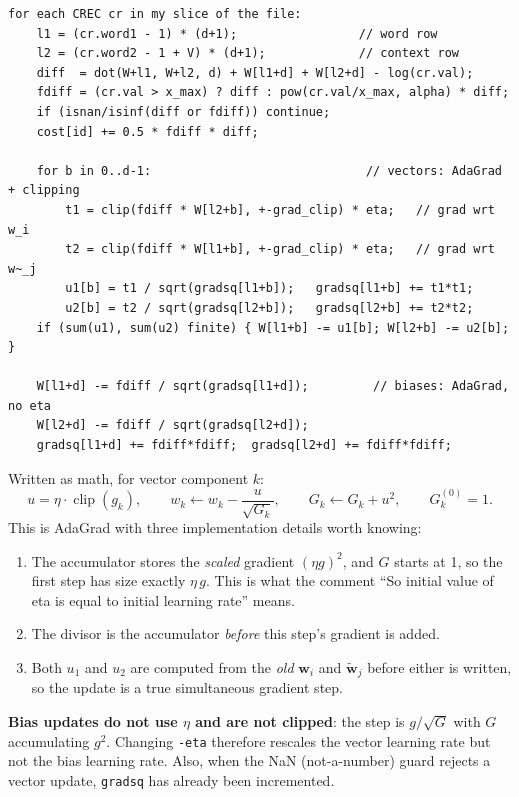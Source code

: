 \documentclass[11pt,a4paper]{article}
\newcommand{\fn}[1]{\texttt{#1()}}
\newcommand{\opt}[1]{\texttt{-#1}}
\newcommand{\wv}{\mathbf{w}}
\newcommand{\cv}{\tilde{\mathbf{w}}}
\begin{document}
\begin{lstlisting}[caption={Core of \fn{glove\_thread}, lightly condensed.},label=lst:inner]
for each CREC cr in my slice of the file:
    l1 = (cr.word1 - 1) * (d+1);                 // word row
    l2 = (cr.word2 - 1 + V) * (d+1);             // context row
    diff  = dot(W+l1, W+l2, d) + W[l1+d] + W[l2+d] - log(cr.val);
    fdiff = (cr.val > x_max) ? diff : pow(cr.val/x_max, alpha) * diff;
    if (isnan/isinf(diff or fdiff)) continue;
    cost[id] += 0.5 * fdiff * diff;

    for b in 0..d-1:                              // vectors: AdaGrad + clipping
        t1 = clip(fdiff * W[l2+b], +-grad_clip) * eta;   // grad wrt w_i
        t2 = clip(fdiff * W[l1+b], +-grad_clip) * eta;   // grad wrt w~_j
        u1[b] = t1 / sqrt(gradsq[l1+b]);   gradsq[l1+b] += t1*t1;
        u2[b] = t2 / sqrt(gradsq[l2+b]);   gradsq[l2+b] += t2*t2;
    if (sum(u1), sum(u2) finite) { W[l1+b] -= u1[b]; W[l2+b] -= u2[b]; }

    W[l1+d] -= fdiff / sqrt(gradsq[l1+d]);         // biases: AdaGrad, no eta
    W[l2+d] -= fdiff / sqrt(gradsq[l2+d]);
    gradsq[l1+d] += fdiff*fdiff;  gradsq[l2+d] += fdiff*fdiff;
\end{lstlisting}

Written as math, for vector component $k$:
\[
  u = \eta\cdot\operatorname{clip}(g_k),\qquad
  w_k \leftarrow w_k - \frac{u}{\sqrt{G_k}},\qquad
  G_k \leftarrow G_k + u^2,\qquad G_k^{(0)}=1.
\]
This is AdaGrad with three implementation details worth knowing:
\begin{enumerate}[nosep]
  \item The accumulator stores the \emph{scaled} gradient $(\eta g)^2$, and $G$ starts
        at 1, so the first step has size exactly $\eta\, g$. This is what the comment ``So
        initial value of eta is equal to initial learning rate'' means.
  \item The divisor is the accumulator \emph{before} this step's gradient is added.
  \item Both $u_1$ and $u_2$ are computed from the \emph{old} $\wv_i$ and $\cv_j$ before
        either is written, so the update is a true simultaneous gradient step.
\end{enumerate}

\begin{pitfall}
\textbf{Bias updates do not use $\eta$ and are not clipped}: the step is
$g/\sqrt{G}$ with $G$ accumulating $g^2$. Changing \opt{eta} therefore rescales the vector
learning rate but not the bias learning rate. Also, when the NaN (not-a-number) guard rejects a vector
update, \texttt{gradsq} has already been incremented.
\end{pitfall}
\end{document}
